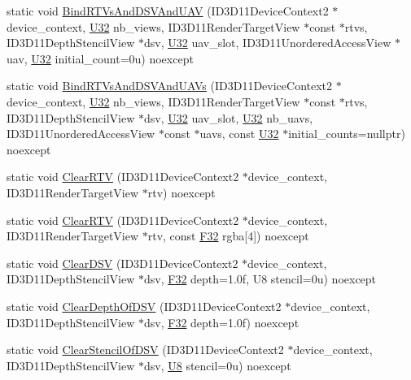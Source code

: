 \begin{DoxyCompactItemize}
\item 
static void \hyperlink{structmage_1_1_pipeline_1_1_o_m_a580a31641605827bf76022bd9792f1eb}{Bind\+R\+T\+Vs\+And\+D\+S\+V\+And\+U\+AV} (I\+D3\+D11\+Device\+Context2 $\ast$device\+\_\+context, \hyperlink{namespacemage_a41c104c036fba3756a74e19f793eeaa1}{U32} nb\+\_\+views, I\+D3\+D11\+Render\+Target\+View $\ast$const $\ast$rtvs, I\+D3\+D11\+Depth\+Stencil\+View $\ast$dsv, \hyperlink{namespacemage_a41c104c036fba3756a74e19f793eeaa1}{U32} uav\+\_\+slot, I\+D3\+D11\+Unordered\+Access\+View $\ast$uav, \hyperlink{namespacemage_a41c104c036fba3756a74e19f793eeaa1}{U32} initial\+\_\+count=0u) noexcept
\item 
static void \hyperlink{structmage_1_1_pipeline_1_1_o_m_a22221554ecef9c2e5b6097a1a4652f92}{Bind\+R\+T\+Vs\+And\+D\+S\+V\+And\+U\+A\+Vs} (I\+D3\+D11\+Device\+Context2 $\ast$device\+\_\+context, \hyperlink{namespacemage_a41c104c036fba3756a74e19f793eeaa1}{U32} nb\+\_\+views, I\+D3\+D11\+Render\+Target\+View $\ast$const $\ast$rtvs, I\+D3\+D11\+Depth\+Stencil\+View $\ast$dsv, \hyperlink{namespacemage_a41c104c036fba3756a74e19f793eeaa1}{U32} uav\+\_\+slot, \hyperlink{namespacemage_a41c104c036fba3756a74e19f793eeaa1}{U32} nb\+\_\+uavs, I\+D3\+D11\+Unordered\+Access\+View $\ast$const $\ast$uavs, const \hyperlink{namespacemage_a41c104c036fba3756a74e19f793eeaa1}{U32} $\ast$initial\+\_\+counts=nullptr) noexcept
\item 
static void \hyperlink{structmage_1_1_pipeline_1_1_o_m_a0a40eb7a844d2861e74582879afec962}{Clear\+R\+TV} (I\+D3\+D11\+Device\+Context2 $\ast$device\+\_\+context, I\+D3\+D11\+Render\+Target\+View $\ast$rtv) noexcept
\item 
static void \hyperlink{structmage_1_1_pipeline_1_1_o_m_a0e83357b9289a95ecedc6c940c26d957}{Clear\+R\+TV} (I\+D3\+D11\+Device\+Context2 $\ast$device\+\_\+context, I\+D3\+D11\+Render\+Target\+View $\ast$rtv, const \hyperlink{namespacemage_aa97e833b45f06d60a0a9c4fc22ae02c0}{F32} rgba\mbox{[}4\mbox{]}) noexcept
\item 
static void \hyperlink{structmage_1_1_pipeline_1_1_o_m_aa8cb14de927cbb9419adfb652d083006}{Clear\+D\+SV} (I\+D3\+D11\+Device\+Context2 $\ast$device\+\_\+context, I\+D3\+D11\+Depth\+Stencil\+View $\ast$dsv, \hyperlink{namespacemage_aa97e833b45f06d60a0a9c4fc22ae02c0}{F32} depth=1.\+0f, U8 stencil=0u) noexcept
\item 
static void \hyperlink{structmage_1_1_pipeline_1_1_o_m_a531fd167683b24c3c66ecc99b5b10c7f}{Clear\+Depth\+Of\+D\+SV} (I\+D3\+D11\+Device\+Context2 $\ast$device\+\_\+context, I\+D3\+D11\+Depth\+Stencil\+View $\ast$dsv, \hyperlink{namespacemage_aa97e833b45f06d60a0a9c4fc22ae02c0}{F32} depth=1.\+0f) noexcept
\item 
static void \hyperlink{structmage_1_1_pipeline_1_1_o_m_a3be72469fce415cfb0f00f8f6e898817}{Clear\+Stencil\+Of\+D\+SV} (I\+D3\+D11\+Device\+Context2 $\ast$device\+\_\+context, I\+D3\+D11\+Depth\+Stencil\+View $\ast$dsv, \hyperlink{namespacemage_afc638980bc6154f15af5e2d93a0e0ea9}{U8} stencil=0u) noexcept
\end{DoxyCompactItemize}
